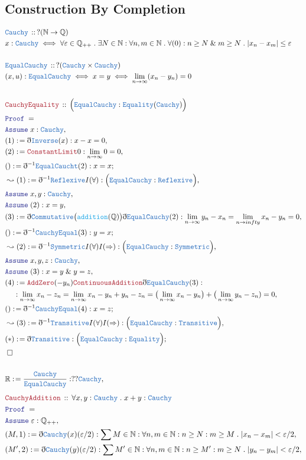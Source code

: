 \documentclass[12pt]{scrartcl}
\newcommand{\TYPE}[1]{\textcolor{NavyBlue}{\mathtt{#1}}}
\newcommand{\FUNC}[1]{\textcolor{Cerulean}{\mathtt{#1}}}
\newcommand{\LOGIC}[1]{\textcolor{Blue}{\mathtt{#1}}}
\newcommand{\THM}[1]{\textcolor{Maroon}{\mathtt{#1}}}
\renewcommand{\.}{\; . \;}
\newcommand{\de}{: \kern 0.1pc =}
\newcommand{\Theorem}[2]{& \THM{#1} \, :: \, #2 \\ & \Proof = \\ }
\newcommand{\DeclareType}[2]{& \TYPE{#1} \, :: \, #2 \\}
\newcommand{\DefineType}[3]{& #1 : \TYPE{#2} \iff #3 \\}
\newcommand{\DefineNamedType}[4]{& #1 : \TYPE{#2} \iff #3 \iff #4 \\}
\newcommand{\NewLine}{\\ & \kern 1pc}
\newcommand{\Page}[1]{ \begin{align*} #1 \end{align*}   }
\newcommand{ \bd }{ \ByDef }
\renewcommand{\And}{\; \& \;}
\newcommand{\Reals}{\mathbb{R} }
\newcommand{\Rats}{\mathbb{Q} }
\newcommand{\Nat}{\mathbb{N} }
\newcommand{\Say}[3]{& #1 \de #2 : #3, \\}
\newcommand{\Conclude}[3]{& #1 \de #2 : #3; \\}
\newcommand{\Derive}[3]{& \leadsto #1 \de #2 : #3, \\}
\newcommand{\Assume}[2]{& \LOGIC{Assume} \;#1 : #2, \\}
\newcommand{\QED}{\; \square}
\newcommand{\EndProof}{& \QED \\}
\newcommand{\ByDef}{\eth}
\newcommand{\Proof}{\LOGIC{Proof} \; }
\begin{document}
\subsection{Construction By Completion}
\Page{
	\DeclareType{Cauchy}{ ?(\Nat \to \Rats)  }
	\DefineType{x}{Cauchy}{  \forall \varepsilon \in \Rats_{++} \. \exists N \in \Nat : \forall n,m \in \Nat 
		\.  \forall  (0) : n \ge N \And m \ge N \. | x_n - x_m| \le \varepsilon
	}
	\\
	\DeclareType{EqualCauchy}{ ?(\TYPE{Cauchy}\times\TYPE{Cauchy})    }
	\DefineNamedType{(x,u)}{EqualCauchy}{  x = y }{ \lim_{n \to \infty} (x_n - y_n) = 0}
	\\
	\Theorem{CauchyEquality}{ \Big( \TYPE{EqualCauchy} : \TYPE{Equality}(\TYPE{Cauchy}) \Big)  }
	\Assume{x}{\TYPE{Cauchy}}
	\Say{ (1) }{ \bd \TYPE{Inverse}(x)}{ x - x = 0}
	\Say{(2)}{ \THM{ConstantLimit}{0}  }{\lim_{n \to \infty} 0 = 0}
	\Conclude{()}{\bd^{-1} \TYPE{EqualCaucht}(2)}{ x = x  }
	\Derive{(1)}{\bd^{-1} \TYPE{Reflexive} I(\forall)}{ \Big( \TYPE{EqualCauchy} : \TYPE{Reflexive}  \Big) }
	\Assume{x,y}{\TYPE{Cauchy}}
	\Assume{(2)}{ x = y}
	\Say{(3)}{\bd \TYPE{Commutative}\big(\FUNC{addition}(\Rats)\big)\bd \TYPE{EqualCauchy}(2)}
	{ \lim_{n \to \infty} y_n  - x_n = \lim_{n \to infty} x_n - y_n = 0 }
	\Conclude{()}{\bd^{-1} \TYPE{CauchyEqual}(3)}{ y = x}
	\Derive{(2)}{\bd^{-1}\TYPE{Symmetric}I(\forall)I(\Rightarrow)}{ \Big( \TYPE{EqualCauchy} : \TYPE{Symmetric} \Big) }
	\Assume{x,y,z}{\TYPE{Cauchy}}
	\Assume{(3)}{x = y \And y = z}
	\Say{(4)}{ \THM{AddZero}(-y_n)\THM{ContinuousAddition}\bd \TYPE{EqualCauchy}(3) }
	{ 
	\NewLine :
		\lim_{n \to \infty} x_n - z_n = \lim_{n \to \infty} x_n - y_n + y_n - z_n 	
		= \big(\lim_{n \to \infty} x_n - y_n \big) + \big(\lim_{n \to \infty} y_n - z_n) = 0}
	\Conclude{()}{ \bd^{-1} \TYPE{CauchyEqual}(4) }{x = z}
	\Derive{(3)}{\bd^{-1} \TYPE{Transitive} I(\forall) I(\Rightarrow)}{ \Big( \TYPE{EqualCauchy} : \TYPE{Transitive}   \Big)  }
	\Conclude{(*)}{\bd \TYPE{Transitive}}{\Big( \TYPE{EqualCauchy} : \TYPE{Equality}   \Big)}
	\EndProof
	\\
	\Say{\Reals}{ \frac{\TYPE{Cauchy}}{\TYPE{EqualCauchy}}}{??\TYPE{Cauchy}}
}\Page{
	\Theorem{CauchyAddition}{\forall x,y : \TYPE{Cauchy} \. x + y : \TYPE{Cauchy}}
	\Assume{\varepsilon}{\Rats_{++}}
	\Say{ (M,1)  }{ \bd \TYPE{Cauchy}(x)(\varepsilon/2)  }
	{\sum M \in \Nat : \forall n,m \in \Nat :  n \ge N : m \ge M \. | x_n - x_m | < \varepsilon/2 }
	\Say{ (M',2)  }{ \bd \TYPE{Cauchy}(y)(\varepsilon/2)  }
	{\sum M' \in \Nat : \forall n,m \in \Nat :  n \ge M' : m \ge N \. | y_n - y_m | < \varepsilon/2 }
}
\end{document}
